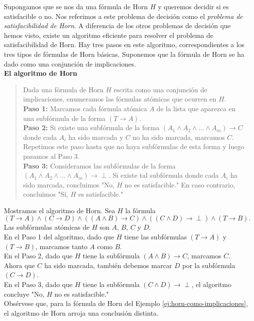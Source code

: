 \documentclass[12pt,a4paper]{book}
\newcommand{\comillas}[1]{"#1"}
\begin{document}
    Supongamos que se nos da una fórmula de Horn $H$ y queremos decidir si es satisfacible o no. Nos referimos a este
    problema de decisión como el \textit{problema de satisfacibilidad de Horn}. A diferencia de los otros problemas de
    decisión que hemos visto, existe un algoritmo eficiente para resolver el problema de satisfacibilidad de Horn. Hay tres
    pasos en este algoritmo, correspondientes a los tres tipos de fórmulas de Horn básicas. Suponemos que la fórmula de Horn
    se ha dado como una conjunción de implicaciones.\\

    \noindent\textbf{El algoritmo de Horn}

    \begin{quote}
        Dada una fórmula de Horn $H$ escrita como una conjunción de implicaciones, enumeramos las fórmulas atómicas que
        ocurren en $H$.\\[0.2cm]
        \textbf{Paso 1:} Marcamos cada fórmula atómica $A$ de la lista que aparezca en una subfórmula de la forma
        $(T\rightarrow A)$.\\[0.2cm]
        \textbf{Paso 2:} Si existe una subfórmula de la forma $(A_{1}\wedge A_{2}\wedge\dots\wedge A_{m})\rightarrow C$ donde
        cada $A_{i}$ ha sido marcada y $C$ no ha sido marcada, marcamos $C$. Repetimos este paso hasta que no haya
        subfórmulas de esta forma y luego pasamos al Paso 3.\\[0.2cm]
        \textbf{Paso 3:} Consideramos las subfórmulas de la forma $(A_{1}\wedge A_{2}\wedge\dots\wedge A_{m})\rightarrow\perp$.
        Si existe tal subfórmula donde cada $A_{i}$ ha sido marcada, concluimos \comillas{No, $H$ no es satisfacible.} En
        caso contrario, concluimos \comillas{Sí, $H$ es satisfacible.}
    \end{quote}

    \begin{ejemplo}\label{ej:algoritmo-horn}
        Mostramos el algoritmo de Horn. Sea $H$ la fórmula
        \begin{equation*}
            (T\rightarrow A)\wedge(C\rightarrow D)\wedge((A\wedge B)\rightarrow C)\wedge((C\wedge D)\rightarrow\perp)\wedge(T\rightarrow B).
        \end{equation*}
        Las subfórmulas atómicas de $H$ son $A$, $B$, $C$ y $D$.\\
        En el Paso 1 del algoritmo, dado que $H$ tiene las subfórmulas $(T\rightarrow A)$ y $(T\rightarrow B)$, marcamos
        tanto $A$ como $B$.\\
        En el Paso 2, dado que $H$ tiene la subfórmula $(A\wedge B)\rightarrow C$, marcamos $C$. Ahora que $C$ ha sido
        marcada, también debemos marcar $D$ por la subfórmula $(C\rightarrow D)$.\\
        En el Paso 3, dado que $H$ tiene la subfórmula $(C\wedge D)\rightarrow\perp$, el algoritmo concluye \comillas{No, $H$
        no es satisfacible.}\\
        Obsérvese que, para la fórmula de Horn del Ejemplo \ref{ej:horn-como-implicaciones}, el algoritmo de Horn arroja una
        conclusión distinta.
    \end{ejemplo}
\end{document}

